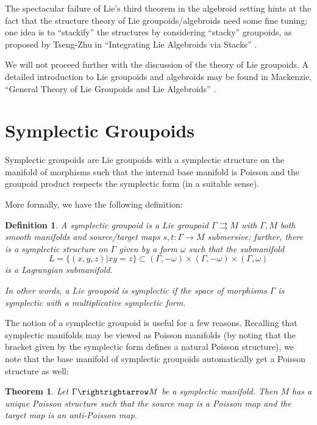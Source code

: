 \documentclass{tufte-handout}
\newtheorem{thrm}{Theorem}
\newtheorem{defn}{Definition}
\begin{document}
The spectacular failure of Lie's third theorem in the algebroid setting hints at the fact that the structure theory of Lie groupoids/algebroids need some fine tuning; one idea is to ``stackify'' the structures by considering ``stacky'' groupoids, as proposed by Tseng-Zhu in ``Integrating Lie Algebroids via Stacks'' \cite{tsengzhu}.

We will not proceed further with the discussion of the theory of Lie groupoids. A detailed introduction to Lie groupoids and algebroids may be found in Mackenzie, ``General Theory of Lie Groupoids and Lie Algebroids'' \cite{mackenzie}.

\section{Symplectic Groupoids}
Symplectic groupoids are Lie groupoids with a symplectic structure on the manifold of morphisms such that the internal base manifold is Poisson and the groupoid product respects the symplectic form (in a suitable sense).

More formally, we have the following definition:
\begin{defn}
A \emph{symplectic groupoid} is a Lie groupoid $\Gamma \rightrightarrows M$ with $\Gamma, M$ both smooth manifolds and source/target maps $s,t: \Gamma \to M$ submersive; further, there is a symplectic structure on $\Gamma$ given by a form $\omega$ such that the submanifold
$$
L = \{(x,y,z) | xy = z \} \subset (\Gamma,-\omega) \times (\Gamma,-\omega) \times (\Gamma,\omega)
$$
is a Lagrangian submanifold.

In other words, a Lie groupoid is \emph{symplectic} if the space of morphisms $\Gamma$ is symplectic with a multiplicative symplectic form.
\end{defn} %

The notion of a symplectic groupoid is useful for a few reasons. Recalling that symplectic manifolds may be viewed as Poisson manifolds (by noting that the bracket given by the symplectic form defines a natural Poisson structure), we note that the base manifold of symplectic groupoids automatically get a Poisson structure as well:
\begin{thrm}
Let $\Gamma \rightrightarrow M$ be a symplectic manifold. Then $M$ has a unique Poisson structure such that the source map is a Poisson map and the target map is an anti-Poisson map.
\end{thrm}
\end{document}
